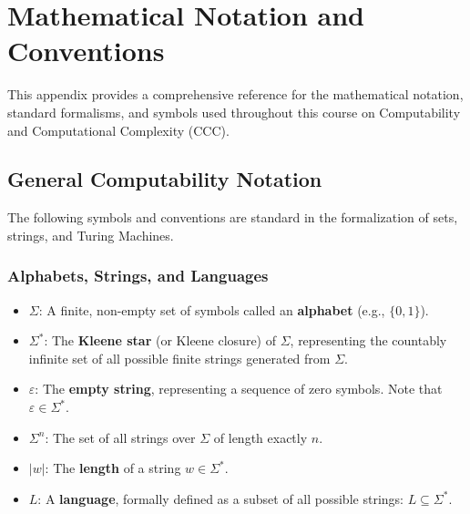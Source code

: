 \chapter{Mathematical Notation and Conventions}
\label{app:notation}

This appendix provides a comprehensive reference for the mathematical notation, standard formalisms, and symbols used throughout this course on Computability and Computational Complexity (CCC). 

\section{General Computability Notation}
The following symbols and conventions are standard in the formalization of sets, strings, and Turing Machines.

\subsection*{Alphabets, Strings, and Languages}
\begin{itemize}
    \item \(\Sigma\): A finite, non-empty set of symbols called an \textbf{alphabet} (e.g., \(\{0, 1\}\)).
    \item \(\Sigma^*\): The \textbf{Kleene star} (or Kleene closure) of \(\Sigma\), representing the countably infinite set of all possible finite strings generated from \(\Sigma\).
    \item \(\varepsilon\): The \textbf{empty string}, representing a sequence of zero symbols. Note that \(\varepsilon \in \Sigma^*\).
    \item \(\Sigma^n\): The set of all strings over \(\Sigma\) of length exactly \(n\).
    \item \(|w|\): The \textbf{length} of a string \(w \in \Sigma^*\).
    \item \(L\): A \textbf{language}, formally defined as a subset of all possible strings: \(L \subseteq \Sigma^*\).
\end{itemize}

